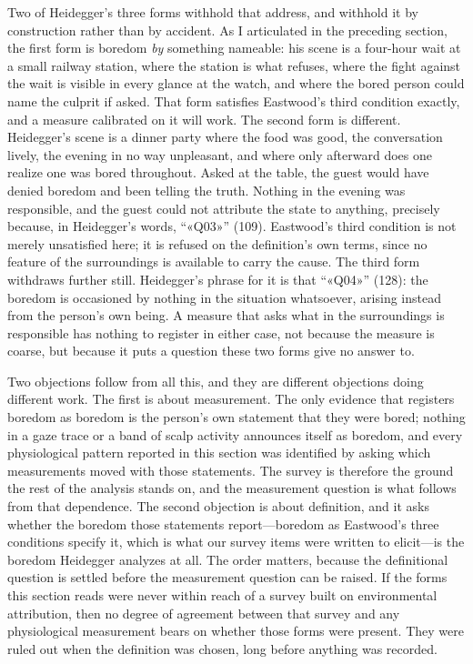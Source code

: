 Two of Heidegger's three forms withhold that address, and withhold it by construction rather
than by accident. As I articulated in the preceding section, the first form is boredom
\textit{by} something nameable: his scene is a four-hour wait at a small railway station, where
the station is what refuses, where the fight against the wait is visible in every glance at the
watch, and where the bored person could name the culprit if asked. That form satisfies
Eastwood's third condition exactly, and a measure calibrated on it will work. The second form
is different. Heidegger's scene is a dinner party where the food was good, the conversation
lively, the evening in no way unpleasant, and where only afterward does one realize one was
bored throughout. Asked at the table, the guest would have denied boredom and been telling the
truth. Nothing in the evening was responsible, and the guest could not attribute the state to
anything, precisely because, in Heidegger's words, ``«Q03»'' (109). Eastwood's third condition is not merely
unsatisfied here; it is refused on the definition's own terms, since no feature of the
surroundings is available to carry the cause. The third form withdraws further still.
Heidegger's phrase for it is that ``«Q04»'' (128): the boredom is occasioned by nothing in the
situation whatsoever, arising instead from the person's own being. A measure that asks what in
the surroundings is responsible has nothing to register in either case, not because the measure
is coarse, but because it puts a question these two forms give no answer to.

Two objections follow from all this, and they are different objections doing different work.
The first is about measurement. The only evidence that registers boredom as boredom is the
person's own statement that they were bored; nothing in a gaze trace or a band of scalp
activity announces itself as boredom, and every physiological pattern reported in this section
was identified by asking which measurements moved with those statements. The survey is
therefore the ground the rest of the analysis stands on, and the measurement question is what
follows from that dependence. The second objection is about definition, and it asks whether the
boredom those statements report---boredom as Eastwood's three conditions specify it, which is
what our survey items were written to elicit---is the boredom Heidegger analyzes at all. The
order matters, because the definitional question is settled before the measurement question can
be raised. If the forms this section reads were never within reach of a survey built on
environmental attribution, then no degree of agreement between that survey and any physiological
measurement bears on whether those forms were present. They were ruled out when the definition
was chosen, long before anything was recorded.

